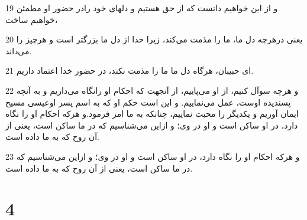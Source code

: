 \par 19 و از این خواهیم دانست که از حق هستیم و دلهای خود رادر حضور او مطمئن خواهیم ساخت،
\par 20 یعنی درهرچه دل ما، ما را مذمت می‌کند، زیرا خدا از دل ما بزرگتر است و هرچیز را می‌داند.
\par 21 ‌ای حبیبان، هرگاه دل ما ما را مذمت نکند، در حضور خدا اعتماد داریم.
\par 22 و هرچه سوآل کنیم، از او می‌پاییم، از آنجهت که احکام او رانگاه می‌داریم و به آنچه پسندیده اوست، عمل می‌نماییم. و این است حکم او که به اسم پسر اوعیسی مسیح ایمان آوریم و یکدیگر را محبت نماییم، چنانکه به ما امر فرمود.و هرکه احکام او را نگاه دارد، در او ساکن است و او در وی؛ و ازاین می‌شناسیم که در ما ساکن است، یعنی از آن روح که به ما داده است.
\par 23 و هرکه احکام او را نگاه دارد، در او ساکن است و او در وی؛ و ازاین می‌شناسیم که در ما ساکن است، یعنی از آن روح که به ما داده است.

\chapter{4}

